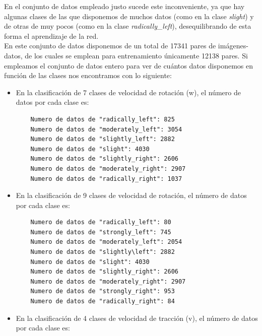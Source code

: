 En el conjunto de datos empleado justo sucede este inconveniente, ya que hay algunas clases de las que disponemos de muchos datos (como en la clase \textit{slight}) y de otras de muy pocos (como en la clase \textit{radically\_left}), desequilibrando de esta forma el aprendizaje de la red.\\

En este conjunto de datos disponemos de un total de 17341 pares de imágenes-datos, de los cuales se emplean para entrenamiento únicamente 12138 pares. Si empleamos el conjunto de datos entero para ver de cuántos datos disponemos en función de las clases nos encontramos con lo siguiente:\\

\begin{itemize}
    \item En la clasificación de 7 clases de velocidad de rotación (w), el número de datos por cada clase es:

    \vspace{10pt}
    \begin{lstlisting}
    Numero de datos de "radically_left": 825
    Numero de datos de "moderately_left": 3054
    Numero de datos de "slightly_left": 2882
    Numero de datos de "slight": 4030
    Numero de datos de "slightly_right": 2606
    Numero de datos de "moderately_right": 2907
    Numero de datos de "radically_right": 1037
    \end{lstlisting}
    \vspace{20pt}


    \item En la clasificación de 9 clases de velocidad de rotación,  el número de datos por cada clase es:

    \vspace{10pt}
    \begin{lstlisting}
    Numero de datos de "radically_left": 80 
    Numero de datos de "strongly_left": 745
    Numero de datos de "moderately_left": 2054
    Numero de datos de "slightly\left": 2882
    Numero de datos de "slight": 4030
    Numero de datos de "slightly_right": 2606
    Numero de datos de "moderately_right": 2907
    Numero de datos de "strongly_right": 953
    Numero de datos de "radically_right": 84
    \end{lstlisting}
    \vspace{20pt}


    \item En la clasificación de 4 clases de velocidad de tracción (v),  el número de datos por cada clase es:


\end{itemize}
